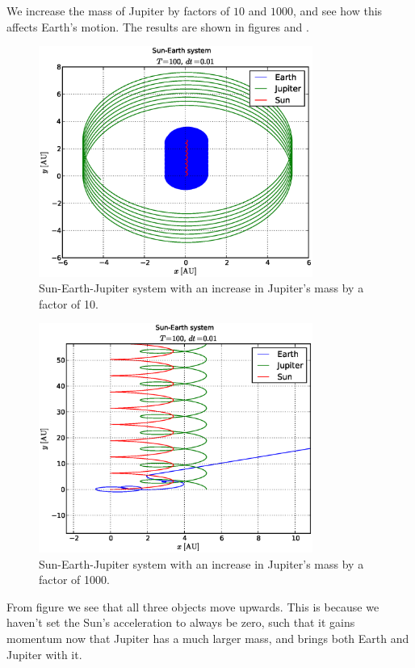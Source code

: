 %
We increase the mass of Jupiter by factors of $10$ and $1000$, and see how this
affects Earth's motion. The results are shown in figures  and
.
\begin{figure}[htpb]
	\centering
	\includegraphics[width=0.8\textwidth]{figures/sun_earth_jupiter_incmass10}
	\caption{Sun-Earth-Jupiter system with an increase in Jupiter's mass by a
	factor of 10.}
	\label{fig:jupiter10}
\end{figure}
%
\begin{figure}[htpb]
	\centering
	\includegraphics[width=0.8\textwidth]{figures/sun_earth_jupiter_incmass1000}
	\caption{Sun-Earth-Jupiter system with an increase in Jupiter's mass by a
	factor of 1000.}
	\label{fig:jupiter1000}
\end{figure}
From figure  we see that all three objects move upwards. This
is because we haven't set the Sun's acceleration to
always be zero, such that it gains momentum now that Jupiter has a much larger
mass, and brings both Earth and Jupiter with it.

